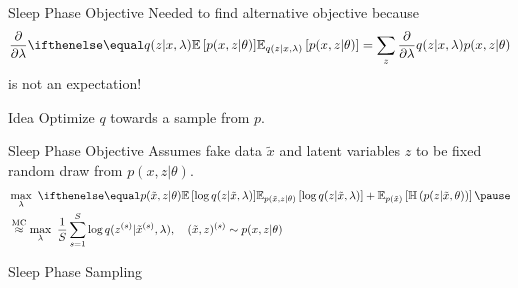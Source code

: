 \documentclass[14pt]{beamer}
\begin{document}
\begin{frame}{Sleep Phase Objective}
Needed to find alternative objective because
$$ \pdv{\lambda} \E[q(z|x, \lambda)]{p(x,z|\theta)} = \sum_{z}\pdv{\lambda}q(z|x, \lambda)p(x,z|\theta) $$
is not an expectation!
\pause
\begin{block}{Idea}
Optimize $ q $ towards a sample from $ p $.
\end{block}

\end{frame}


\begin{frame}{Sleep Phase Objective}
Assumes fake data $ \tilde{x} $ and latent variables $ z $ to be fixed random draw from $ p(x,z|\theta) $.
\begin{equation*}
\begin{aligned}
&\max_{\lambda}~  \E[p(\tilde x, z|\theta)]{\log q(z|\tilde x, \lambda)} + \mathbb E_{p(\tilde x)}\left[\Ent{p(z|\tilde{x},\theta)}\right] \pause \\
&\overset{\text{MC}}{\approx} \max_{\lambda}~ \frac{1}{S}\sum_{s=1}^{S} \log q(z^{(s)}|\tilde{x}^{(s)}, \lambda),~~~ (\tilde{x},z)^{(s)} \sim p(x,z|\theta)
\end{aligned}
\end{equation*} 

\end{frame}

\begin{frame}{Sleep Phase Sampling}
\begin{figure}
\center
{}
\end{figure}
\end{frame}
\end{document}
